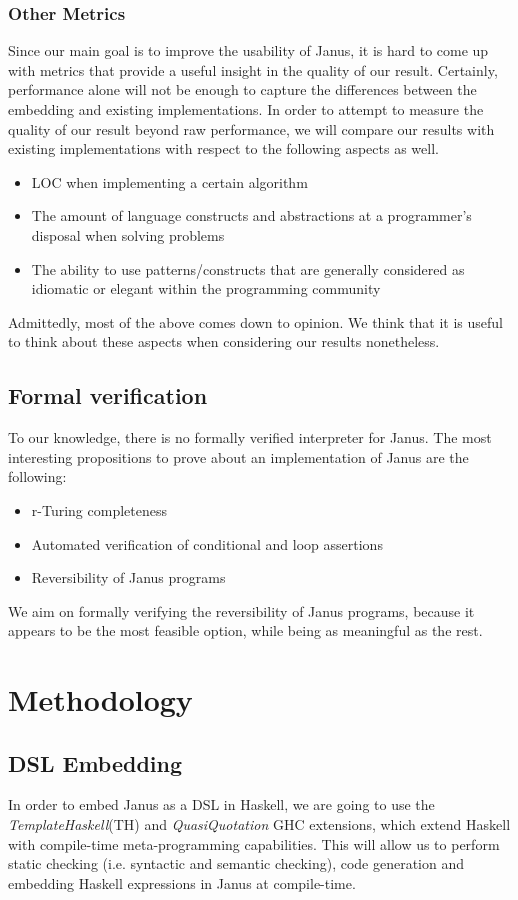 \documentclass[12pt,a4paper]{article}
\begin{document}
    \subsubsection{Other Metrics}
    Since our main goal is to improve the usability of Janus, it is hard to come up with metrics that provide a useful insight in the quality of our result. Certainly, performance alone will not be enough to capture the differences between the embedding and existing implementations. In order to attempt to measure the quality of our result beyond raw performance, we will compare our results with existing implementations with respect to the following aspects as well. 
	\begin{itemize}
		\item{LOC when implementing a certain algorithm}
		\item{The amount of language constructs and abstractions at a programmer's disposal when solving problems}
        \item{The ability to use patterns/constructs that are generally considered as idiomatic or elegant within the programming community}
	\end{itemize}
Admittedly, most of the above comes down to opinion. We think that it is useful to think about these aspects when considering our results nonetheless. 
	
\subsection{Formal verification}
To our knowledge, there is no formally verified interpreter for Janus. The most interesting propositions to prove about an implementation of Janus are the following:
\begin{itemize}
	\item r-Turing completeness
	\item Automated verification of conditional and loop assertions
	\item Reversibility of Janus programs
\end{itemize}
We aim on formally verifying the reversibility of Janus programs, because it appears to be the most feasible option, while being as meaningful as the rest.

\section{Methodology}
\subsection{DSL Embedding}
\label{subsec:template-haskell}
In order to embed Janus as a DSL in Haskell, we are going to use the \textit{TemplateHaskell}(TH)\cite{sheard02} and \textit{QuasiQuotation}\cite{mainland07} GHC extensions, which extend Haskell with compile-time meta-programming capabilities. This will allow us to perform static checking (i.e. syntactic and semantic checking), code generation and embedding Haskell expressions in Janus at compile-time.
\end{document}
